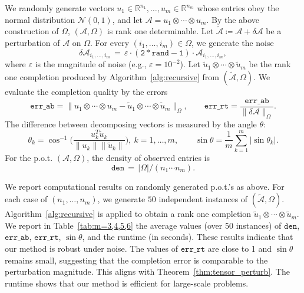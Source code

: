 \documentclass{amsart}
\newcommand{\re}{\mathbb{R}}
\newcommand{\vareps}{\varepsilon}
\newcommand{\dt}{\delta}
\newcommand{\tu}{\tilde{u}}
\newcommand{\mt}[1]{\mathtt{#1}}
\newcommand{\mc}[1]{\mathcal{#1}}
\newcommand{\ddd}{,\ldots,}
\theoremstyle{definition}
\numberwithin{equation}{section}
\begin{document}
We randomly generate vectors $u_1 \in \re^{n_1} \ddd u_m \in \re^{n_m}$ whose entries obey the normal distribution $\mc{N}(0,1)$,
and let
$
\mc{A} = u_1 \otimes \cdots \otimes u_m.
$
By the above construction of $\Omega$, $(\mc{A}, \Omega)$ is rank one determinable.
Let $\widetilde{\mc{A}} \coloneqq \mc{A} + \dt\mc{A}$ be a perturbation of $\mc{A}$ on $\Omega$.
For every $(i_1 \ddd i_m) \in \Omega$, we generate the noise 
\[
\dt\mc{A}_{i_1 \ddd i_m} \,=\, \vareps \cdot (\mt{2*rand-1}) \cdot \mc{A}_{i_1 \ddd i_m},
\]
where $\vareps$ is the magnitude of noise (e.g., $\vareps = 10^{-2}$).
Let $\tu_1 \otimes \cdots \otimes \tu_m$ be the rank one completion produced by Algorithm~\ref{alg:recursive} from $(\widetilde{\mc{A}}, \Omega)$.
We evaluate the completion quality by the errors
\[
\mt{err\_ab} = \|u_1 \otimes \cdots \otimes u_m - \tu_1 \otimes \cdots \otimes \tu_m \|_{\Omega},
\qquad \mt{err\_rt} = \frac{\mt{err\_ab}}{\|\dt\mc{A}\|_{\Omega}}.
\]
The difference between decomposing vectors is measured by the angle $\theta$:
\[
\theta_k = \cos^{-1} \Big( \frac{u_k^T\tu_k}{\|u_k\| \|\tu_k\|} \Big), \
k = 1 \ddd m,
\qquad \sin\theta = \frac{1}{m} \sum_{k=1}^m |\sin \theta_k|.
\]
For the p.o.t. $(\mc{A}, \Omega)$, the density of observed entries is
\[
\mt{den} \,=\, |\Omega| / (n_1 \cdots n_m).
\]





We report computational results on randomly generated p.o.t.'s as above.
For each case of $(n_1,\ldots,n_m)$, 
we generate $50$ independent instances of $(\widetilde{\mc{A}},\Omega)$.
Algorithm~\ref{alg:recursive} is applied to obtain a rank one completion
$\tu_1 \otimes \cdots \otimes \tu_m$. 
We report in Table~\ref{tab:m=3,4,5,6} the average values (over 50 instances)
of $\mt{den}$,  $\mt{err\_ab}$, $\mt{err\_rt}$, 
$\sin\theta$, and the runtime (in seconds).
These results indicate that our method is robust under noise.
The values of $\mt{err\_rt}$ are close to 1 and $\sin\theta$ remains small,
suggesting that the completion error is comparable to the perturbation magnitude.
This aligns with Theorem~\ref{thm:tensor_perturb}.
The runtime shows that our method is efficient for large-scale problems.
\end{document}
